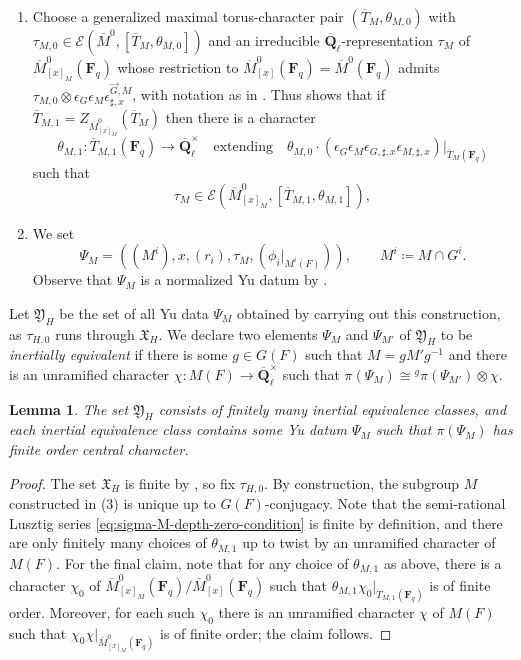 \documentclass[reqno]{amsart}
\numberwithin{equation}{subsection}
\newcommand{\F}{\mathbf{F}}
\newcommand{\Q}{\mathbf{Q}}
\newcommand{\ol}[1]{\overline{#1}}
\newcommand{\co}{\colon}
\newcommand\cE{\mathcal{E}}
\newtheorem{lemma}[thm]{Lemma}
\theoremstyle{remark}
\numberwithin{equation}{subsection}
\numberwithin{figure}{subsection}
\begin{document}
\begin{enumerate}
\item Choose a generalized maximal torus-character pair $(\ol T_M, \theta_{M,0})$ with $\tau_{M,0} \in \cE(\ol M^0, [\ol T_M, \theta_{M,0}])$ and an irreducible $\ol\Q_\ell$-representation $\tau_M$ of $\ol M^0_{[x]_M}(\F_q)$ whose restriction to $\ol M^0_{[x]}(\F_q) = \ol M^0(\F_q)$ admits $\tau_{M,0} \otimes \epsilon_G\epsilon_M\epsilon_{\sharp,x}^{\vec{G},M}$, with notation as in \cite[\S\S 3.3 and 6.5]{CF26a}. Thus \cite[Lemma~2.10.3]{Cot26b} shows that if $\ol T_{M,1} = Z_{\ol M^0_{[x]_M}}(\ol T_M)$ then there is a character
\[
\theta_{M,1}\co \ol T_{M,1}(\F_q) \to \ol\Q_\ell^\times \quad \text{extending} \quad \theta_{M,0} \cdot (\epsilon_G\epsilon_M\epsilon_{G,\sharp,x}\epsilon_{M,\sharp,x})|_{\ol T_M(\F_q)}
\]
such that
\begin{equation}\label{eq:sigma-M-depth-zero-condition}
\tau_M \in \cE\left(\ol M^0_{[x]_M},
\left[
\ol T_{M,1},
\theta_{M,1}\right]\right),
\end{equation}
\item We set
\[
\Psi_M = ((M^i), x, (r_i), \tau_M, (\phi_i|_{M^i(F)})), \qquad M^i \coloneqq M \cap G^i.
\]
Observe that $\Psi_M$ is a normalized Yu datum by \cite[Proposition~9.3.2]{CF26a}.
\end{enumerate}
Let $\mathfrak Y_H$ be the set of all Yu data $\Psi_M$ obtained by carrying out this construction, as $\tau_{H,0}$ runs through $\mathfrak X_H$. We declare two elements $\Psi_M$ and $\Psi_{M'}$ of $\mathfrak Y_H$ to be \emph{inertially equivalent} if there is some $g \in G(F)$ such that $M = gM'g^{-1}$ and there is an unramified character $\chi\co M(F)\to\ol\Q_\ell^\times$ such that $\pi(\Psi_M)\cong{}^g\pi(\Psi_{M'})\otimes\chi$.

\begin{lemma}\label{lemma:finite-adapted-inertial-classes}
The set $\mathfrak{Y}_H$ consists of finitely many inertial equivalence classes, and each inertial equivalence class contains some Yu datum $\Psi_M$ such that $\pi(\Psi_M)$ has finite order central character.
\end{lemma}

\begin{proof}
The set $\mathfrak X_H$ is finite by \cite[Lemma~2.8.3]{Cot26b}, so fix $\tau_{H,0}$. By construction, the subgroup $M$ constructed in (3) is unique up to $G(F)$-conjugacy. Note that the semi-rational Lusztig series \eqref{eq:sigma-M-depth-zero-condition} is finite by definition, and there are only finitely many choices of $\theta_{M,1}$ up to twist by an unramified character of $M(F)$. For the final claim, note that for any choice of $\theta_{M,1}$ as above, there is a character $\chi_0$ of $\ol M^0_{[x]_M}(\F_q)/\ol M^0_{[x]}(\F_q)$ such that $\theta_{M,1}\chi_0|_{\ol T_{M,1}(\F_q)}$ is of finite order. Moreover, for each such $\chi_0$ there is an unramified character $\chi$ of $M(F)$ such that $\chi_0 \chi|_{\ol M^0_{[x]_M}(\F_q)}$ is of finite order; the claim follows.
\end{proof}
\end{document}
